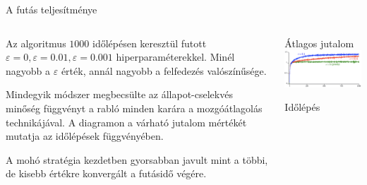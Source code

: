 \documentclass[english, aspectratio=169]{beamer}
\begin{document}
\begin{frame}{A futás teljesítménye}
\begin{columns}
\begin{column}{.5\textwidth}
Az algoritmus $1000$ időlépésen keresztül futott $\varepsilon=0,\varepsilon=0.01,\varepsilon=0.001$ hiperparaméterekkel. Minél nagyobb a $\varepsilon$ érték, annál nagyobb a felfedezés valószínűsége. \par\smallskip 
Mindegyik módszer megbecsülte az állapot-cselekvés minőség függvényt a rabló minden karára a mozgóátlagolás technikájával. A diagramon a várható jutalom mértékét mutatja az időlépések függvényében. 
\par\smallskip
A mohó stratégia kezdetben gyorsabban javult mint a többi, de kisebb értékre konvergált a futásidő végére.
\end{column}
\begin{column}{.5\textwidth}
\begin{center}
Átlagos jutalom
\includegraphics[width=7cm, keepaspectratio]{images/solving_7.png}
\begin{scriptsize}
Időlépés
\end{scriptsize}
\end{center}
\end{column}
\end{columns}
\end{frame}
\end{document}
